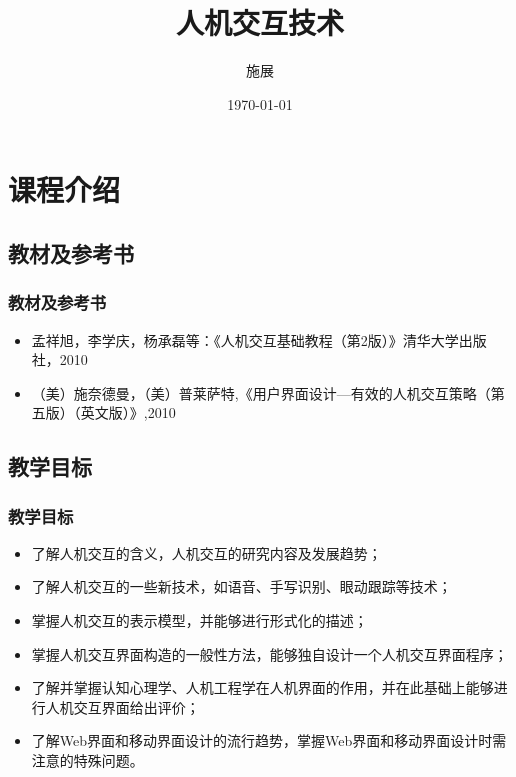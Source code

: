 \documentclass{beamer}
\title{人机交互技术}
\author{施展}
\institute{华中科技大学~武汉光电国家实验室}
\date{\today}
\begin{document}
\begin{frame}
	\titlepage
\end{frame}

\begin{frame}
	\tableofcontents
\end{frame}
  
\section{课程介绍}
\subsection{教材及参考书}
\begin{frame}
	\frametitle{教材及参考书}
	\begin{itemize}[<+-|alert@+>]
		\item 孟祥旭，李学庆，杨承磊等：《人机交互基础教程（第2版）》清华大学出版社，2010
		\item （美）施奈德曼，（美）普莱萨特,《用户界面设计—有效的人机交互策略（第五版）（英文版）》,2010
	\end{itemize}
\end{frame}

\subsection{教学目标}
\begin{frame}
	\frametitle{教学目标}
	\begin{itemize}[<+-|alert@+>]
		\item 了解人机交互的含义，人机交互的研究内容及发展趋势；
		\item 了解人机交互的一些新技术，如语音、手写识别、眼动跟踪等技术；
		\item 掌握人机交互的表示模型，并能够进行形式化的描述；
		\item 掌握人机交互界面构造的一般性方法，能够独自设计一个人机交互界面程序；
		\item 了解并掌握认知心理学、人机工程学在人机界面的作用，并在此基础上能够进行人机交互界面给出评价；
		\item 了解Web界面和移动界面设计的流行趋势，掌握Web界面和移动界面设计时需注意的特殊问题。
	\end{itemize}
\end{frame}
\end{document}
